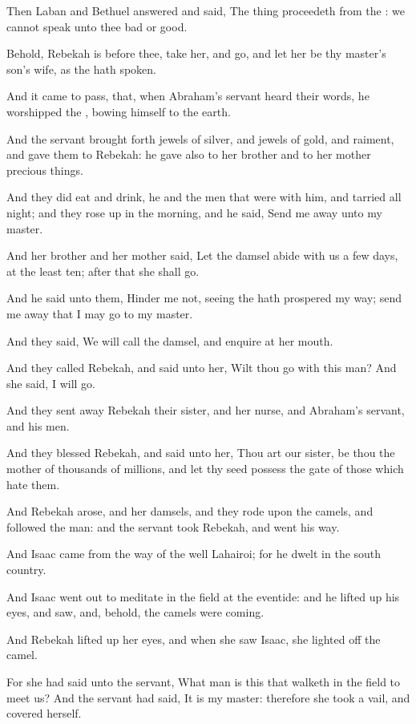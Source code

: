 \verse Then Laban and Bethuel answered and said, The thing proceedeth from the \LORD: we cannot speak unto thee bad or good.

\verse Behold, Rebekah is before thee, take her, and go, and let her be thy master's son's wife, as the \LORD hath spoken.

\verse And it came to pass, that, when Abraham's servant heard their words, he worshipped the \LORD, bowing himself to the earth.

\verse And the servant brought forth jewels of silver, and jewels of gold, and raiment, and gave them to Rebekah: he gave also to her brother and to her mother precious things.

\verse And they did eat and drink, he and the men that were with him, and tarried all night; and they rose up in the morning, and he said, Send me away unto my master.

\verse And her brother and her mother said, Let the damsel abide with us a few days, at the least ten; after that she shall go.

\verse And he said unto them, Hinder me not, seeing the \LORD hath prospered my way; send me away that I may go to my master.

\verse And they said, We will call the damsel, and enquire at her mouth.

\verse And they called Rebekah, and said unto her, Wilt thou go with this man? And she said, I will go.

\verse And they sent away Rebekah their sister, and her nurse, and Abraham's servant, and his men.

\verse And they blessed Rebekah, and said unto her, Thou art our sister, be thou the mother of thousands of millions, and let thy seed possess the gate of those which hate them.

\verse And Rebekah arose, and her damsels, and they rode upon the camels, and followed the man: and the servant took Rebekah, and went his way.

\verse And Isaac came from the way of the well Lahairoi; for he dwelt in the south country.

\verse And Isaac went out to meditate in the field at the eventide: and he lifted up his eyes, and saw, and, behold, the camels were coming.

\verse And Rebekah lifted up her eyes, and when she saw Isaac, she lighted off the camel.

\verse For she had said unto the servant, What man is this that walketh in the field to meet us? And the servant had said, It is my master: therefore she took a vail, and covered herself.

